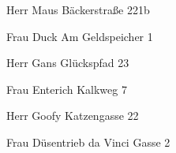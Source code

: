 \documentclass[12pt,ngerman]{scrartcl}
\begin{document}
	
    Herr
    Maus
    Bäckerstraße 221b

    
	
    Frau
    Duck
    Am Geldspeicher 1

    
	
    Herr
    Gans
    Glückspfad 23

    
	
    Frau
    Enterich
    Kalkweg 7

    
	
    Herr
    Goofy
    Katzengasse 22

    
	
    Frau
    Düsentrieb
    da Vinci Gasse 2

    
	
\end{document}
